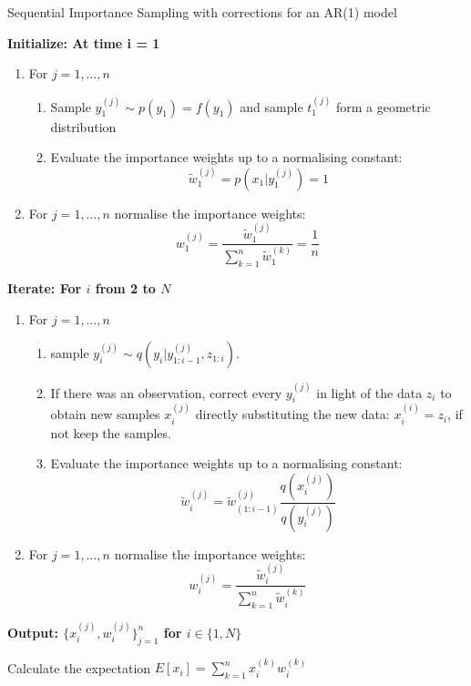 \documentclass[11pt,a4paper]{article}
\begin{document}
\begin{algorithm}[H]
\caption{Sequential Importance Sampling with corrections for an AR(1) model}\label{euclid}
 \begin{algorithmic}

 \State  \bf{Initialize:} \normalfont At time i = 1
            
\begin{enumerate}
	\item For $j = 1, \dots , n$
	\begin{enumerate}
		\item Sample $y_{1}^{(j)} \sim p(y_{1}) = f(y_{1})$ and sample $t_1^{(j)}$ form a geometric distribution
		\item Evaluate the importance weights up to a normalising constant:
		\[
		\tilde{w}^{(j)}_{1} = p(x_{1} | y_{1}^{(j)}) = 1
		\]
	\end{enumerate}
	\item For $j = 1, \dots , n$ normalise the importance weights: 
	\[
	w^{(j)}_{1} = \frac{\tilde{w}^{(j)}_{1}}{\sum_{k=1}^{n}\tilde{w}^{(k)}_{1}} = \frac{1}{n}
	\]
\end{enumerate}

 \State  \bf{Iterate:} \normalfont For $i$ from 2 to $N$

\begin{enumerate}
	\item For $j = 1, \dots , n$
	\begin{enumerate}
  		\item sample $y_{i}^{(j)} \sim q(y_{i} | y_{1:i - 1}^{(j)} , z_{1 : i})$.
		\item {If there was an observation, correct every $y_{i}^{(j)}$ in light of the data $z_{i}$ to obtain new samples $x_{i}^{(j)}$ directly substituting the new data: $x_i^{(i)} = z_{i}$, if not keep the samples.}
		\item Evaluate the importance weights up to a normalising constant:
		\[
		\tilde{w}^{(j)}_{i} = \tilde{w}^{(j)}_{(1:i - 1)} \frac{q(x_{i}^{(j)})}{q(y_{i}^{(j)})}
		\]
	\end{enumerate}
	\item For $j = 1, \dots , n$ normalise the importance weights:
	\[
	w^{(j)}_{i} = \frac{\tilde{w}^{(j)}_{i}}{\sum_{k=1}^{n}\tilde{w}^{(k)}_{i}}
	\]
	

\end{enumerate}

\State  \bf{Output:} \normalfont $\Big \{ x_{i}^{(j)} , w_{i}^{(j)} \Big \}_{j = 1}^{n}$ for $i \in \{ 1, N \}$

\item Calculate the expectation  $E[x_i] = \sum_{k=1}^{n} x^{(k)}_i w_{i}^{(k)}$


        

  
 \end{algorithmic}
\end{algorithm}
\end{document}

